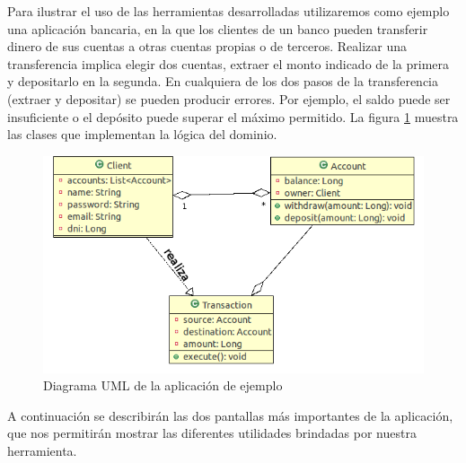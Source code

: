 Para ilustrar el uso de las herramientas desarrolladas utilizaremos como ejemplo
una aplicación bancaria, en la que los clientes de un banco pueden transferir
dinero de sus cuentas a otras cuentas propias o de terceros. 
Realizar una transferencia implica elegir dos cuentas, extraer el
monto indicado de la primera y depositarlo en la segunda. 
En cualquiera de los dos pasos de la transferencia (extraer y depositar) se
pueden producir errores.
Por ejemplo, el saldo puede ser insuficiente o el depósito puede superar el
máximo permitido.
La figura \ref{example} muestra las clases que implementan la lógica del
dominio.

	\begin{figure}[!h]
		\centering
		\includegraphics[scale=0.4]{img/transaccion}
		\caption{Diagrama UML de la aplicación de ejemplo}
		\label{example}
	\end{figure}	

A continuación se describirán las dos pantallas más importantes de la
aplicación, que nos permitirán mostrar las diferentes utilidades brindadas por
nuestra herramienta.
 
